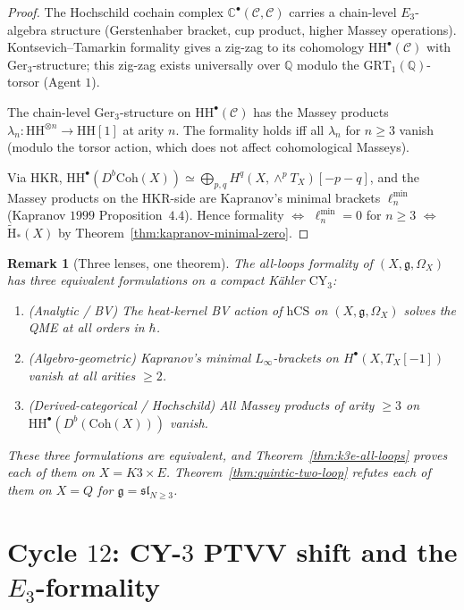 \documentclass[11pt]{article}
\newtheorem{remark}[theorem]{Remark}
\providecommand{\CY}{\mathrm{CY}}
\providecommand{\hCS}{\mathrm{hCS}}
\providecommand{\HH}{\mathrm{HH}}
\providecommand{\Coh}{\mathrm{Coh}}
\providecommand{\Om}{\Omega}
\providecommand{\cC}{\mathcal{C}}
\providecommand{\fg}{\mathfrak{g}}
\providecommand{\CC}{\mathbb{C}}
\providecommand{\QQ}{\mathbb{Q}}
\providecommand{\Ger}{\mathrm{Ger}}
\providecommand{\GRT}{\mathrm{GRT}}
\begin{document}
\begin{proof}
The Hochschild cochain complex $\CC^\bullet(\cC, \cC)$ carries
a chain-level $E_3$-algebra structure (Gerstenhaber bracket,
cup product, higher Massey operations).  Kontsevich--Tamarkin
formality gives a zig-zag to its cohomology $\HH^\bullet(\cC)$ with
$\Ger_3$-structure;  this zig-zag exists universally over $\QQ$
modulo the $\GRT_1(\QQ)$-torsor (Agent $1$).

The chain-level $\Ger_3$-structure on $\HH^\bullet(\cC)$ has the
Massey products $\lambda_n: \HH^{\otimes n} \to \HH[1]$ at arity
$n$.  The formality holds iff all $\lambda_n$ for $n \geq 3$
vanish (modulo the torsor action, which does not affect
cohomological Masseys).

Via HKR, $\HH^\bullet(D^b\Coh(X)) \simeq \bigoplus_{p,q} H^q(X,
\wedge^p T_X)[-p-q]$, and the Massey products on the HKR-side
are Kapranov's minimal brackets $\ell_n^{\min}$ (Kapranov $1999$
Proposition~$4.4$).  Hence formality $\iff$ $\ell_n^{\min} = 0$
for $n \geq 3$ $\iff$ $\widetilde{\mathrm{H}}_*(X)$ by
Theorem~\ref{thm:kapranov-minimal-zero}.
\end{proof}

\begin{remark}[Three lenses, one theorem]
\label{rem:three-lenses}
The all-loops formality of $(X, \fg, \Om_X)$ has three equivalent
formulations on a compact K\"ahler $\CY_3$:
\begin{enumerate}[label=\textup{(\arabic*)}]
\item (Analytic / BV) The heat-kernel BV action of $\hCS$ on
$(X, \fg, \Om_X)$ solves the QME at all orders in $\hbar$.
\item (Algebro-geometric) Kapranov's minimal $L_\infty$-brackets
on $H^\bullet(X, T_X[-1])$ vanish at all arities $\geq 2$.
\item (Derived-categorical / Hochschild) All Massey products of
arity $\geq 3$ on $\HH^\bullet(D^b(\Coh(X)))$ vanish.
\end{enumerate}
These three formulations are equivalent, and
Theorem~\ref{thm:k3e-all-loops} proves each of them on $X = K3\times E$.
Theorem~\ref{thm:quintic-two-loop} refutes each of them on $X = Q$
for $\fg = \mathfrak{sl}_{N \geq 3}$.
\end{remark}

\section{Cycle $12$:  CY-$3$ PTVV shift and the $E_3$-formality}
\label{sec:cycle-12-ptvv-shift}
\end{document}
